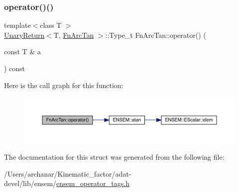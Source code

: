 \subsubsection{\texorpdfstring{operator()()}{operator()()}\hspace{0.1cm}{\footnotesize\ttfamily [3/3]}}
{\footnotesize\ttfamily template$<$class T $>$ \\
\mbox{\hyperlink{structUnaryReturn}{Unary\+Return}}$<$T, \mbox{\hyperlink{structFnArcTan}{Fn\+Arc\+Tan}} $>$\+::Type\+\_\+t Fn\+Arc\+Tan\+::operator() (\begin{DoxyParamCaption}\item[{const T \&}]{a }\end{DoxyParamCaption}) const\hspace{0.3cm}{\ttfamily [inline]}}

Here is the call graph for this function\+:
\nopagebreak
\begin{figure}[H]
\begin{center}
\leavevmode
\includegraphics[width=350pt]{df/dc4/structFnArcTan_a7e6a58ff73a64fb87d8a8a232050a225_cgraph}
\end{center}
\end{figure}


The documentation for this struct was generated from the following file\+:\begin{DoxyCompactItemize}
\item 
/\+Users/archanar/\+Kinematic\+\_\+factor/adat-\/devel/lib/ensem/\mbox{\hyperlink{adat-devel_2lib_2ensem_2ensem__operator__tags_8h}{ensem\+\_\+operator\+\_\+tags.\+h}}\end{DoxyCompactItemize}
